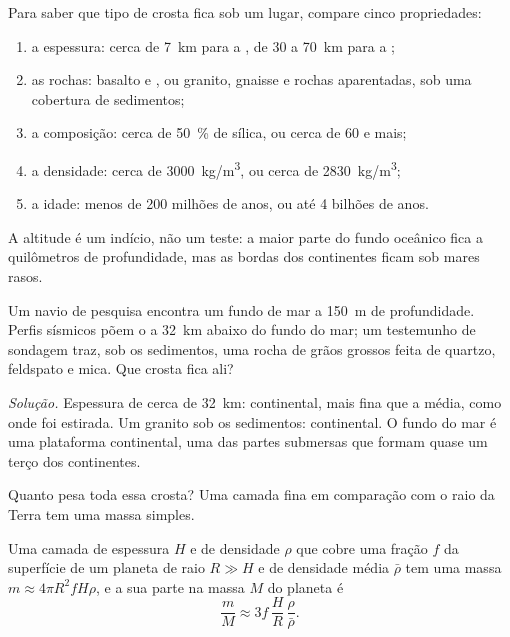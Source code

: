 \begin{method}\label{met:g12:continental-crust:compare}
Para saber que tipo de crosta fica sob um lugar, compare cinco propriedades:
\begin{enumerate}
  \item a espessura: cerca de \qty{7}{km} para a , de 30 a
        \qty{70}{km} para a ;
  \item as rochas: basalto e , ou granito, gnaisse e rochas aparentadas,
        sob uma cobertura de sedimentos;
  \item a composição: cerca de \qty{50}{\percent} de sílica, ou cerca de 60
        e mais;
  \item a densidade: cerca de \qty{3000}{kg/m^3}, ou cerca de \qty{2830}{kg/m^3};
  \item a idade: menos de 200 milhões de anos, ou até 4 bilhões de anos.
\end{enumerate}
A altitude é um indício, não um teste: a maior parte do fundo oceânico fica
a quilômetros de profundidade, mas as bordas dos continentes ficam sob mares
rasos.
\end{method}

\begin{example}\label{ex:g12:continental-crust:shelf}
Um navio de pesquisa encontra um fundo de mar a \qty{150}{m} de
profundidade. Perfis sísmicos põem o  a \qty{32}{km} abaixo do fundo do
mar; um testemunho de sondagem traz, sob os sedimentos, uma rocha de grãos
grossos feita de quartzo, feldspato e mica. Que crosta fica ali?

\emph{Solução.} Espessura de cerca de \qty{32}{km}: continental, mais fina
que a média, como onde foi estirada. Um granito sob os sedimentos:
continental. O fundo do mar é uma plataforma continental, uma das partes
submersas que formam quase um terço dos continentes.
\end{example}

Quanto pesa toda essa crosta? Uma camada fina em comparação com o raio da
Terra tem uma massa simples.

\begin{proposition}\label{prop:g12:continental-crust:thin-layer}
Uma camada de espessura $H$ e de densidade $\rho$ que cobre uma fração $f$
da superfície de um planeta de raio $R \gg H$ e de densidade média
$\bar\rho$ tem uma massa $m \approx 4\pi R^2 f H \rho$, e a sua parte na
massa $M$ do planeta é
\[
  \frac{m}{M} \approx 3 f\,\frac{H}{R}\,\frac{\rho}{\bar\rho}.
\]
\end{proposition}

